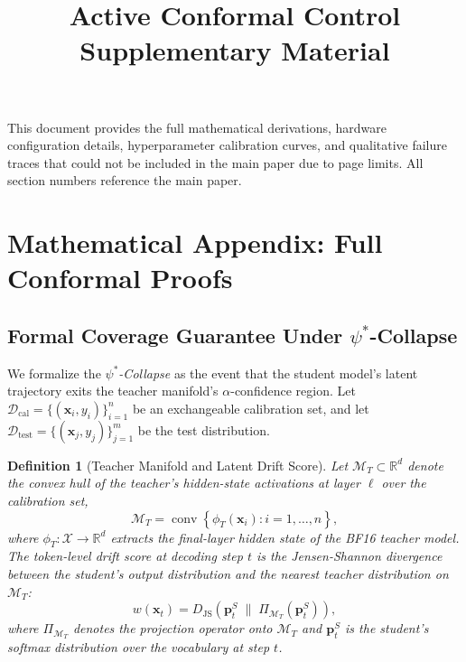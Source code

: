 \documentclass[twoside]{article}
\newtheorem{definition}{Definition}
\begin{document}
\title{Active Conformal Control\\[4pt]
\textbf{Supplementary Material}}

\maketitle

\noindent This document provides the full mathematical derivations, hardware configuration details, hyperparameter calibration curves, and qualitative failure traces that could not be included in the main paper due to page limits. All section numbers reference the main paper.

\appendix

\section{Mathematical Appendix: Full Conformal Proofs}
\label{app:proofs}

\subsection{Formal Coverage Guarantee Under \texorpdfstring{$\psi^*$}{psi*}-Collapse}
\label{app:coverage}

We formalize the \emph{$\psi^*$-Collapse} as the event that the student model's latent trajectory exits the teacher manifold's $\alpha$-confidence region.  Let $\mathcal{D}_\text{cal} = \{(\mathbf{x}_i, y_i)\}_{i=1}^{n}$ be an exchangeable calibration set, and let $\mathcal{D}_\text{test} = \{(\mathbf{x}_j, y_j)\}_{j=1}^{m}$ be the test distribution.

\begin{definition}[Teacher Manifold and Latent Drift Score]
Let $\mathcal{M}_T \subset \mathbb{R}^d$ denote the convex hull of the teacher's hidden-state activations at layer $\ell$ over the calibration set,
\begin{equation}
  \mathcal{M}_T = \operatorname{conv}\!\left\{ \phi_T(\mathbf{x}_i) : i = 1,\ldots,n \right\},
\end{equation}
where $\phi_T : \mathcal{X} \to \mathbb{R}^{d}$ extracts the final-layer hidden state of the BF16 teacher model. The token-level drift score at decoding step $t$ is the Jensen-Shannon divergence between the student's output distribution and the nearest teacher distribution on $\mathcal{M}_T$:
\begin{equation}
  w(\mathbf{x}_t) = D_\text{JS}\!\left(\mathbf{p}_t^S \;\|\; \Pi_{\mathcal{M}_T}(\mathbf{p}_t^S)\right),
  \label{eq:app_drift}
\end{equation}
where $\Pi_{\mathcal{M}_T}$ denotes the projection operator onto $\mathcal{M}_T$ and $\mathbf{p}_t^S$ is the student's softmax distribution over the vocabulary at step $t$.
\end{definition}
\end{document}
